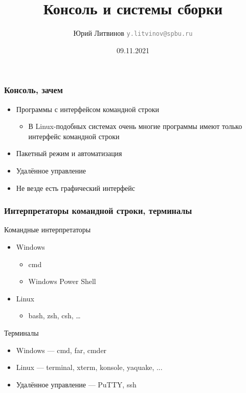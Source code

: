 \documentclass[xetex,mathserif,serif]{beamer}
\title{Консоль и системы сборки}
\author[Юрий Литвинов]{Юрий Литвинов \newline \textcolor{gray}{\small\texttt{y.litvinov@spbu.ru}}}
\date{09.11.2021}
\begin{document}
    
    \frame{\titlepage}

    \begin{frame}
        \frametitle{Консоль, зачем}
        \begin{itemize}
            \item Программы с интерфейсом командной строки
            \begin{itemize}
                \item В Linux-подобных системах очень многие программы имеют только интерфейс командной строки
            \end{itemize}
            \item Пакетный режим и автоматизация
            \item Удалённое управление
            \item Не везде есть графический интерфейс
        \end{itemize}
    \end{frame}

    \begin{frame}
        \frametitle{Интерпретаторы командной строки, терминалы}
        Командные интерпретаторы
        \begin{itemize}
            \item Windows
            \begin{itemize}
                \item cmd
                \item Windows Power Shell
            \end{itemize}
            \item Linux
            \begin{itemize}
                \item bash, zsh, csh, …
            \end{itemize}
        \end{itemize}
        Терминалы
        \begin{itemize}
            \item Windows --- cmd, far, cmder
            \item Linux --- terminal, xterm, konsole, yaquake, ...
            \item Удалённое управление --- PuTTY, ssh
        \end{itemize}
    \end{frame}
\end{document}
